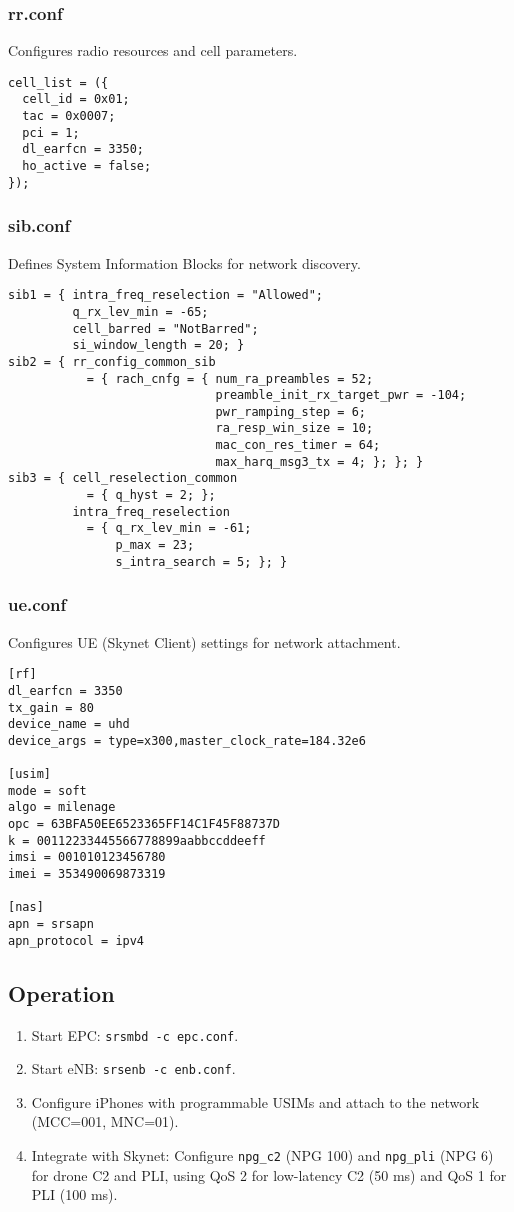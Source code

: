 \documentclass{article}
\begin{document}
\subsubsection{rr.conf}
Configures radio resources and cell parameters.
\begin{lstlisting}
cell_list = ({
  cell_id = 0x01;
  tac = 0x0007;
  pci = 1;
  dl_earfcn = 3350;
  ho_active = false;
});
\end{lstlisting}

\newpage
\subsubsection{sib.conf}
Defines System Information Blocks for network discovery.
\begin{lstlisting}
sib1 = { intra_freq_reselection = "Allowed";
         q_rx_lev_min = -65;
         cell_barred = "NotBarred";
         si_window_length = 20; }
sib2 = { rr_config_common_sib
           = { rach_cnfg = { num_ra_preambles = 52;
                             preamble_init_rx_target_pwr = -104;
                             pwr_ramping_step = 6;
                             ra_resp_win_size = 10;
                             mac_con_res_timer = 64;
                             max_harq_msg3_tx = 4; }; }; }
sib3 = { cell_reselection_common
           = { q_hyst = 2; };
         intra_freq_reselection
           = { q_rx_lev_min = -61;
               p_max = 23;
               s_intra_search = 5; }; }
\end{lstlisting}

\subsubsection{ue.conf}
Configures UE (Skynet Client) settings for network attachment.
\begin{lstlisting}
[rf]
dl_earfcn = 3350
tx_gain = 80
device_name = uhd
device_args = type=x300,master_clock_rate=184.32e6

[usim]
mode = soft
algo = milenage
opc = 63BFA50EE6523365FF14C1F45F88737D
k = 00112233445566778899aabbccddeeff
imsi = 001010123456780
imei = 353490069873319

[nas]
apn = srsapn
apn_protocol = ipv4
\end{lstlisting}

\subsection{Operation}
\begin{enumerate}
\item Start EPC: \texttt{srsmbd -c epc.conf}.
\item Start eNB: \texttt{srsenb -c enb.conf}.
\item Configure iPhones with programmable USIMs and attach to the network (MCC=001, MNC=01).
\item Integrate with Skynet:
       Configure \texttt{npg\_c2} (NPG 100) and
                \texttt{npg\_pli} (NPG 6) for drone C2 and PLI,
                             using QoS 2 for low-latency C2 (50 ms)
                               and QoS 1 for PLI (100 ms).
\end{enumerate}
\end{document}
